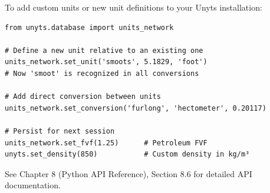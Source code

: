 \documentclass[11pt,a4paper]{report}
\begin{document}
To add custom units or new unit definitions to your Unyts installation:

\begin{lstlisting}[style=pythonstyle]
from unyts.database import units_network

# Define a new unit relative to an existing one
units_network.set_unit('smoots', 5.1829, 'foot')
# Now 'smoot' is recognized in all conversions

# Add direct conversion between units
units_network.set_conversion('furlong', 'hectometer', 0.20117)

# Persist for next session
units_network.set_fvf(1.25)      # Petroleum FVF
unyts.set_density(850)           # Custom density in kg/m³
\end{lstlisting}

See Chapter 8 (Python API Reference), Section 8.6 for detailed API documentation.
\end{document}

